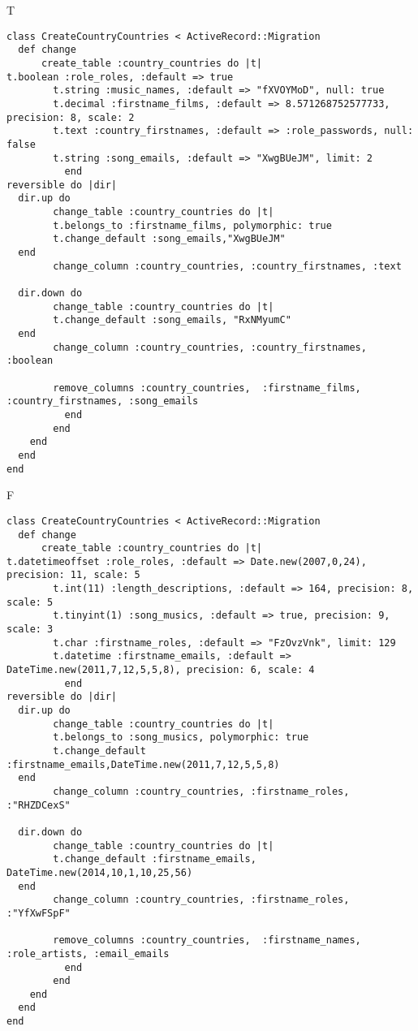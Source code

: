 T
\begin{verbatim}
class CreateCountryCountries < ActiveRecord::Migration
  def change
	  create_table :country_countries do |t|
t.boolean :role_roles, :default => true
		t.string :music_names, :default => "fXVOYMoD", null: true
		t.decimal :firstname_films, :default => 8.571268752577733, precision: 8, scale: 2
		t.text :country_firstnames, :default => :role_passwords, null: false
		t.string :song_emails, :default => "XwgBUeJM", limit: 2
		  end
reversible do |dir|
  dir.up do
		change_table :country_countries do |t|
		t.belongs_to :firstname_films, polymorphic: true
 		t.change_default :song_emails,"XwgBUeJM"
  end
 		change_column :country_countries, :country_firstnames, :text
   
  dir.down do
		change_table :country_countries do |t|
		t.change_default :song_emails, "RxNMyumC"
  end
 		change_column :country_countries, :country_firstnames, :boolean
   
		remove_columns :country_countries,  :firstname_films, :country_firstnames, :song_emails 
	      end
	    end
    end 
  end
end

\end{verbatim}

F
\begin{verbatim}
class CreateCountryCountries < ActiveRecord::Migration
  def change
	  create_table :country_countries do |t|
t.datetimeoffset :role_roles, :default => Date.new(2007,0,24), precision: 11, scale: 5
		t.int(11) :length_descriptions, :default => 164, precision: 8, scale: 5
		t.tinyint(1) :song_musics, :default => true, precision: 9, scale: 3
		t.char :firstname_roles, :default => "FzOvzVnk", limit: 129
		t.datetime :firstname_emails, :default => DateTime.new(2011,7,12,5,5,8), precision: 6, scale: 4
		  end
reversible do |dir|
  dir.up do
		change_table :country_countries do |t|
		t.belongs_to :song_musics, polymorphic: true
 		t.change_default :firstname_emails,DateTime.new(2011,7,12,5,5,8)
  end
 		change_column :country_countries, :firstname_roles, :"RHZDCexS"
   
  dir.down do
		change_table :country_countries do |t|
		t.change_default :firstname_emails, DateTime.new(2014,10,1,10,25,56)
  end
 		change_column :country_countries, :firstname_roles, :"YfXwFSpF"
   
		remove_columns :country_countries,  :firstname_names, :role_artists, :email_emails 
	      end
	    end
    end 
  end
end

\end{verbatim}

